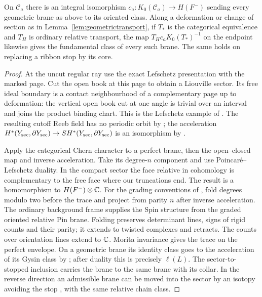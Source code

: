 \begin{lemma}\label{lem:braneclass}
On $\mathcal C_a$ there is an integral isomorphism $c_a:K_0(\mathcal C_a)\to H(F^-)$ sending every geometric brane as above to its oriented class. Along a deformation or change of section as in Lemma~\ref{lem:geometrictransport}, if $T_*$ is the categorical equivalence and $T_H$ is ordinary relative transport, the map $T_Hc_a K_0(T_*)^{-1}$ on the endpoint likewise gives the fundamental class of every such brane. The same holds on replacing a ribbon stop by its core.
\end{lemma}

\begin{proof}
At the uncut regular ray use the exact Lefschetz presentation with the marked page. Cut the open book at this page to obtain a Liouville sector. Its free ideal boundary is a contact neighbourhood of a complementary page up to deformation: the vertical open book cut at one angle is trivial over an interval and joins the product binding chart. This is the Lefschetz example of \cite[Examples~1.4, 2.19--2.20]{GPSI}. The resulting cutoff Reeb field has no periodic orbit by \cite[Lemma~2.36]{GPSI}; the acceleration $H^*(Y_{\rm sec},\partial Y_{\rm sec})\to SH^*(Y_{\rm sec},\partial Y_{\rm sec})$ is an isomorphism by \cite[Proposition~4.42]{GPSI}.

Apply the categorical Chern character to a perfect brane, then the open--closed map and inverse acceleration. Take its degree-$n$ component and use Poincaré--Lefschetz duality. In the compact sector the face relative in cohomology is complementary to the free face where our truncations end. The result is a homomorphism to $H(F^-)\otimes\mathbb C$. For the grading conventions of \cite{GPSI}, fold degrees modulo two before the trace and project from parity $n$ after inverse acceleration. The ordinary background frame supplies the Spin structure from the graded oriented relative Pin brane. Folding preserves determinant lines, signs of rigid counts and their parity; it extends to twisted complexes and retracts. The counts over orientation lines extend to $\mathbb C$. Morita invariance gives the trace on the perfect envelope. On a geometric brane its identity class goes to the acceleration of its Gysin class by \cite[Proposition~5.13]{GPSI}; after duality this is precisely $\ell(L)$. The sector-to-stopped inclusion carries the brane to the same brane with its collar. In the reverse direction an admissible brane can be moved into the sector by an isotopy avoiding the stop \cite[Lemma~3.8]{GPS}, with the same relative chain class.


\end{proof}
